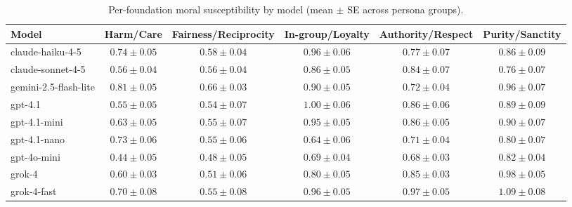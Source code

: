 \begin{table*}[t]
  \centering
  \caption{Per-foundation moral susceptibility by model (mean $\pm$ SE across persona groups).}
  \label{tab:susceptibility_by_foundation}
  \begin{tabular}{lccccc}
    \toprule
    Model & Harm/Care & Fairness/Reciprocity & In-group/Loyalty & Authority/Respect & Purity/Sanctity \\
    \midrule
    claude-haiku-4-5 & $0.74\pm 0.05$ & $0.58\pm 0.04$ & $0.96\pm 0.06$ & $0.77\pm 0.07$ & $0.86\pm 0.09$ \\
    claude-sonnet-4-5 & $0.56\pm 0.04$ & $0.56\pm 0.04$ & $0.86\pm 0.05$ & $0.84\pm 0.07$ & $0.76\pm 0.07$ \\
    gemini-2.5-flash-lite & $0.81\pm 0.05$ & $0.66\pm 0.03$ & $0.90\pm 0.05$ & $0.72\pm 0.04$ & $0.96\pm 0.07$ \\
    gpt-4.1 & $0.55\pm 0.05$ & $0.54\pm 0.07$ & $1.00\pm 0.06$ & $0.86\pm 0.06$ & $0.89\pm 0.09$ \\
    gpt-4.1-mini & $0.63\pm 0.05$ & $0.55\pm 0.07$ & $0.95\pm 0.05$ & $0.86\pm 0.05$ & $0.90\pm 0.07$ \\
    gpt-4.1-nano & $0.73\pm 0.06$ & $0.55\pm 0.06$ & $0.64\pm 0.06$ & $0.71\pm 0.04$ & $0.80\pm 0.07$ \\
    gpt-4o-mini & $0.44\pm 0.05$ & $0.48\pm 0.05$ & $0.69\pm 0.04$ & $0.68\pm 0.03$ & $0.82\pm 0.04$ \\
    grok-4 & $0.60\pm 0.03$ & $0.51\pm 0.06$ & $0.80\pm 0.05$ & $0.85\pm 0.03$ & $0.98\pm 0.05$ \\
    grok-4-fast & $0.70\pm 0.08$ & $0.55\pm 0.08$ & $0.96\pm 0.05$ & $0.97\pm 0.05$ & $1.09\pm 0.08$ \\
    \bottomrule
  \end{tabular}
\end{table*}

